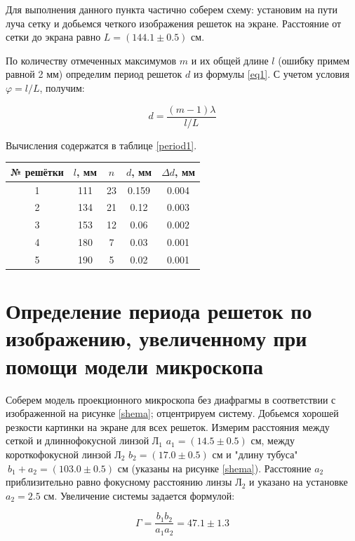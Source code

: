 \documentclass[a4paper,12pt]{article}
\begin{document}
Для выполнения данного пункта частично соберем схему: установим на пути луча сетку и добьемся четкого изображения решеток на экране. Расстояние от сетки до экрана равно $L = (144.1 \pm 0.5)$ см. 

По количеству отмеченных максимумов $m$ и их общей длине $l$ (ошибку примем равной 2 мм) определим период решеток $d$ из формулы \eqref{eq1}. С учетом условия $\varphi = l/L$, получим:

\[ d = \frac{(m-1)\lambda}{l/L} \]

Вычисления содержатся в таблице \ref{period1}.

\begin{center}
\begin{tabular}{|c|c|c|c|c|}
	\hline
	№ решётки & $l$, мм & $n$ & $d$, мм & $\Delta d$, мм \\ \hline
	1           & 111        & 23           & 0.159 & 0.004 \\ \hline
	2           & 134        & 21           & 0.12  & 0.003 \\ \hline
	3           & 153        & 12           & 0.06  & 0.002 \\ \hline
	4           & 180        & 7            & 0.03  & 0.001 \\ \hline
	5           & 190        & 5            & 0.02  & 0.001 \\ \hline
\end{tabular}
\label{period1}
\end{center}

\section*{Определение периода решеток по изображению, увеличенному при помощи модели микроскопа}

Соберем модель проекционного микроскопа без диафрагмы в соответствии с изображенной на рисунке \ref{shema}; отцентрируем систему. Добьемся хорошей резкости картинки на экране для всех решеток. Измерим расстояния между сеткой и длиннофокусной линзой $\text{Л}_1$ $a_1 = (14.5 \pm 0.5)$ см, между короткофокусной линзой $\text{Л}_2$ $b_2 = (17.0 \pm 0.5)$ см и "длину тубуса" $\ b_1 + a_2 = (103.0 \pm 0.5)$ см (указаны на рисунке \ref{shema}). Расстояние $a_2$ приблизительно равно фокусному расстоянию линзы $\text{Л}_2$ и указано на установке $a_2 = 2.5$ см. Увеличение системы задается формулой: 

\[ \Gamma = \frac{b_1b_2}{a_1a_2} = 47.1 \pm 1.3 \]
\end{document}
